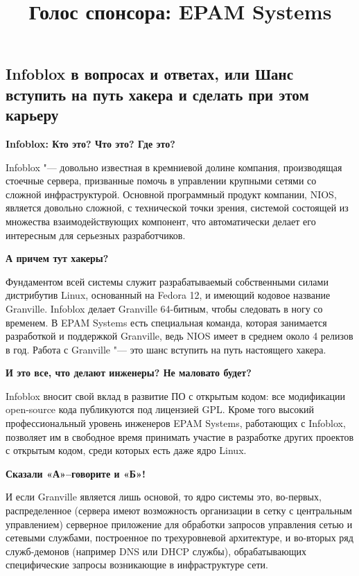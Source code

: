 \documentclass[10pt, a5paper]{article}
\begin{document}
\title{Голос спонсора: EPAM Systems}
\date{}
\maketitle

\subsection*{Infoblox в вопросах и ответах, или Шанс вступить на путь хакера и сделать при этом карьеру}

\textbf{Infoblox:  Кто это? Что это? Где это?}

Infoblox "--- довольно известная в кремниевой долине компания, производящая стоечные 
сервера, призванные помочь в управлении крупными сетями со сложной инфраструктурой. 
Основной программный продукт компании, NIOS, является довольно сложной, с технической 
точки зрения, системой состоящей из множества взаимодействующих компонент, что 
автоматически делает его интересным для серьезных разработчиков.

\textbf{А причем тут хакеры?}

Фундаментом всей системы служит разрабатываемый собственными силами дистрибутив 
Linux, основанный на Fedora 12, и имеющий кодовое название Granville.  Infoblox делает 
Granville 64-битным, чтобы следовать в ногу со временем. В EPAM Systems есть специальная 
команда, которая занимается разработкой и поддержкой Granville, ведь NIOS имеет в среднем 
около 4 релизов в год. Работа с Granville "--- это шанс вступить на путь настоящего хакера.

\textbf{И это все, что делают инженеры? Не маловато будет?}

Infoblox вносит свой вклад в развитие ПО с открытым кодом: все модификации open-source 
кода публикуются под лицензией GPL. Кроме того высокий профессиональный уровень 
инженеров EPAM Systems, работающих с Infoblox, позволяет им в свободное время принимать 
участие в разработке других проектов с открытым кодом, среди которых есть даже ядро 
Linux.

\textbf{Сказали «А»--говорите и «Б»!}

И если Granville является лишь основой, то ядро системы это, во-первых, распределенное 
(сервера имеют возможность организации в сетку с центральным управлением) серверное 
приложение для обработки запросов управления сетью и сетевыми службами, построенное 
по трехуровневой архитектуре, и во-вторых ряд служб-демонов (например DNS или DHCP 
службы), обрабатывающих специфические запросы возникающие в инфраструктуре сети.
\end{document}
